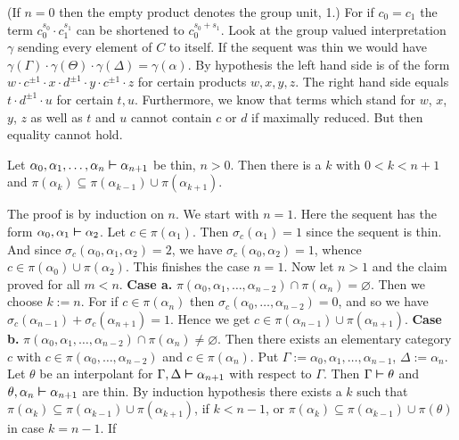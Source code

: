 (If $n = 0$ then the empty product denotes the group unit, 1.)
For if $c_0 = c_1$ the term $c_0^{s_0} \cdot c_1^{s_1}$ can
be shortened to $c_0^{s_0 + s_1}$. Look at the group valued 
interpretation $\gamma$ sending every element of $C$ to itself. 
If the sequent was thin we would have $\gamma(\Gamma) \cdot 
\gamma(\Theta) \cdot \gamma(\Delta) = \gamma(\alpha)$. By 
hypothesis the left hand side is of the form $w \cdot c^{\pm 1} 
\cdot x \cdot d^{\pm 1} \cdot y \cdot c^{\pm 1} \cdot z$ for certain 
products $w, x, y, z$. The right hand side equals $t \cdot d^{\pm 1}
\cdot u$ for certain $t, u$. Furthermore, we know that terms
which stand for $w$, $x$, $y$, $z$ as well as $t$ and $u$ cannot
contain $c$ or $d$ if maximally reduced. But then equality cannot
hold.
\proofend
\begin{lem}
Let $\alpha_0, \alpha_1, \dotsc, \alpha_{n} \boldsymbol{\vdash} \alpha_{n+1}$ be 
thin, $n > 0$. Then there is a $k$ with $0 < k < n + 1$ and
$\pi(\alpha_k) \subseteq \pi(\alpha_{k-1}) \cup \pi(\alpha_{k+1})$.
\end{lem}
\proofbeg
The proof is by induction on $n$. We start with $n = 1$. Here
the sequent has the form $\alpha_0, \alpha_1 \boldsymbol{\vdash} \alpha_2$. Let
$c \in \pi(\alpha_1)$. Then $\sigma_c(\alpha_1) = 1$ since the
sequent is thin. And since $\sigma_c(\alpha_0, \alpha_1, \alpha_2) = 2$,
we have $\sigma_c(\alpha_0, \alpha_2) = 1$, whence
$c \in \pi(\alpha_0) \cup \pi(\alpha_2)$. This finishes the case
$n = 1$. Now let $n > 1$ and the claim proved for all $m < n$. 
\textbf{Case a.} $\pi(\alpha_0, \alpha_1, \dotsc, %
\alpha_{n-2}) \cap \pi(\alpha_{n}) = \varnothing$. Then we choose
$k := n$. For if $c \in \pi(\alpha_{n})$ then $\sigma_c(\alpha_0,
\dotsc, \alpha_{n-2}) = 0$, and so we have $\sigma_c(\alpha_{n-1})
+ \sigma_c(\alpha_{n+1}) = 1$. Hence we get $c \in \pi(\alpha_{n-1})
\cup \pi(\alpha_{n+1})$. \textbf{Case b.} $\pi(\alpha_0,
\alpha_1, \dotsc, \alpha_{n-2}) \cap \pi(\alpha_{n})
\neq \varnothing$. Then there exists an elementary category $c$ with
$c \in \pi(\alpha_0, \dotsc, \alpha_{n-2})$ and
$c \in \pi(\alpha_{n})$. Put $\Gamma := \alpha_0,
\alpha_1, \dotsc, \alpha_{n-1}$, $\Delta := \alpha_{n}$.
Let $\theta$ be an interpolant for $\Gamma, \Delta
\boldsymbol{\vdash} \alpha_{n+1}$ with respect to $\Gamma$. Then $\Gamma \boldsymbol{\vdash}
\theta$ and $\theta, \alpha_n \boldsymbol{\vdash} \alpha_{n+1}$ are thin.
By induction hypothesis there exists a $k$ such that
$\pi(\alpha_k) \subseteq \pi(\alpha_{k-1}) \cup \pi(\alpha_{k+1})$,
if $k < n - 1$, or $\pi(\alpha_k) \subseteq
\pi(\alpha_{k-1}) \cup \pi(\theta)$ in case $k = n-1$. If
